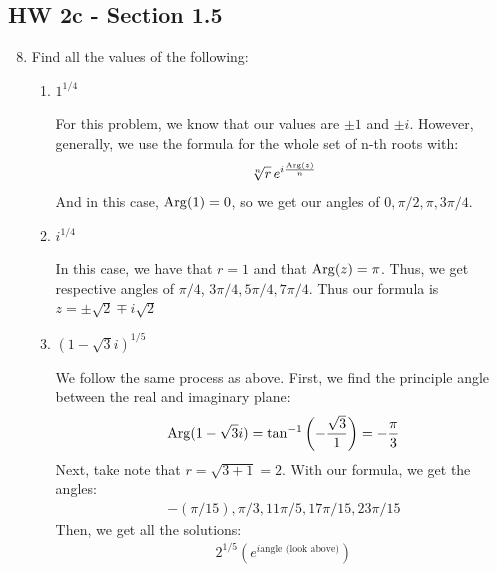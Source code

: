 \subsection*{HW 2c - Section 1.5}
\begin{enumerate}
    \setcounter{enumi}{7}
    \item Find all the values of the following:
    \begin{enumerate}
        \item $1^{1/4}$
		\begin{problem}
			For this problem, we know that our values are $\pm 1$ and $\pm i$. However, generally, we use the formula for the whole set of n-th roots with:
			\begin{align*}
				\sqrt[n]r\,e^{i\frac{\operatorname{Arg}(z)}n}
			\end{align*}
			And in this case, $\operatorname{Arg}(1)=0$, so we get our angles of $0, \pi/2, \pi, 3\pi/4$.
		\end{problem}
    
        \item $i^{1/4}$
		\begin{problem}
			In this case, we have that $r=1$ and that $\operatorname{Arg}(z) = \pi$. Thus, we get respective angles of $\pi/4$, $3\pi/4, 5\pi/4, 7\pi/4$.\gline{}
			Thus our formula is $z=\pm\sqrt 2 \mp i\sqrt 2$
		\end{problem}

        \item $(1-\sqrt{3}i)^{1/5}$
		\begin{problem}
			We follow the same process as above. First, we find the principle angle between the real and imaginary plane:
			\begin{align*}
				\operatorname{Arg}(1 - \sqrt 3i) = \tan^{-1}\left(-\frac{\sqrt{3}}{1}\right)= -\frac{\pi}3
			\end{align*}
			Next, take note that $r = \sqrt{3 + 1} = 2$. \gline{}
			With our formula, we get the angles:
			\begin{align*}
				-(\pi/15),\pi/3, 11\pi/5, 17\pi/15, 23\pi/15
			\end{align*}
			Then, we get all the solutions:
			\begin{align*}
				2^{1/5}(e^{i\text{angle (look above)}})
			\end{align*}
		\end{problem}
    \end{enumerate}


\end{enumerate}
